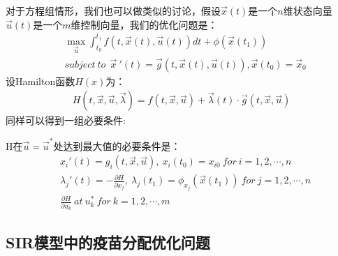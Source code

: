 \documentclass[UTF8]{ctexart}
\begin{document}
		\indent 对于方程组情形，我们也可以做类似的讨论，假设$\vec{x}(t)$是一个$n$维状态向量$\vec{u}(t)$是一个$m$维控制向量，我们的优化问题是：
		\begin{equation}
		\begin{aligned}
		&\max_{\vec{u}}\int_{t_0}^{t_1}f(t,\vec{x}(t),\vec{u}(t))dt+\phi(\vec{x}(t_1))\\
		&subject \ to \ \ \vec{x}\ '(t)=\vec{g}(t,\vec{x}(t),\vec{u}(t)),\vec{x}(t_0)=\vec{x}_0
		\end{aligned}
		\end{equation}
		\indent 设Hamilton函数$H(x)$为：
		\begin{equation}
		\begin{aligned}
		H(t,\vec{x},\vec{u},\vec{\lambda})=f(t,\vec{x},\vec{u})+\vec{\lambda}(t)\cdot \vec{g}(t,\vec{x},\vec{u})
		\end{aligned}
		\end{equation}
		\indent 同样可以得到一组必要条件:
		\begin{deduction}
			H在$\vec{u}=\vec{u}^*$处达到最大值的必要条件是：
			\begin{equation}
			\begin{aligned}
			&x_i'(t)=g_i(t,\vec{x},\vec{u}), \ x_i(t_0)=x_{i0} \ for \ i=1,2,\cdots,n\\
			&\lambda_j'(t)=-\frac{\partial H}{\partial x_j},\ \lambda_j(t_1)=\phi_{x_j}(\vec{x}(t_1)) \ for \ j=1,2,\cdots,n\\
			&\frac{\partial H}{\partial u_k} \ at \ u_k^*  \ for \ k=1,2,\cdots,m
			\end{aligned}
			\end{equation}	
		\end{deduction}
	
	
		\subsection{SIR模型中的疫苗分配优化问题}
	
\end{document}
